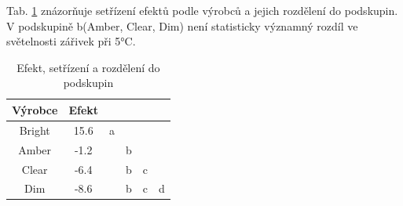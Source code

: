 \documentclass[czech]{article}%
\begin{document}
Tab. \ref{tab:efekty_3} znázorňuje setřízení efektů podle výrobců a jejich rozdělení do podskupin.
V podskupině b(Amber, Clear, Dim) není statisticky významný rozdíl ve světelnosti zářivek při 5°C.

\begin{table}[H]
	\centering
	\caption{Efekt, setřízení a rozdělení do podskupin}
	\label{tab:efekty_3}
    \begin{tabular}{c|c|c|c|c|c}
        Výrobce & Efekt &   &   &   &   \\
        \hline
        Bright  & 15.6  & a &   &   &   \\
        \hline
        Amber   & -1.2  &   & b &   &   \\
        \hline
        Clear   & -6.4  &   & b & c &   \\
        \hline
        Dim     & -8.6  &   & b & c & d \\
    \end{tabular}
\end{table}
\end{document}
